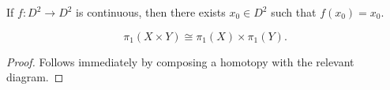 \begin{theorem}\label{thm:kjsdn}
	If $f : D^2 \to D^2$ is continuous, then there exists $x_0\in D^2$ such that $f(x_0)=x_0$.
\end{theorem}
\begin{theorem}\label{thm:jbas}
	\[
		\pi _1(X\times Y)\cong \pi _1(X)\times \pi _1(Y)
	.\]
\end{theorem}
\begin{proof}
	Follows immediately by composing a homotopy with the relevant diagram.
\end{proof}

